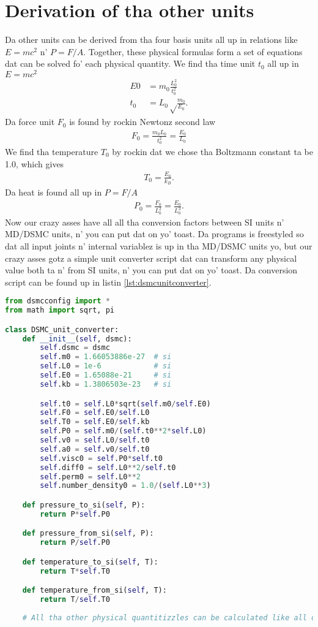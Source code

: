 \section{Derivation of tha other units}
Da other units can be derived from tha four basis units all up in relations like $E=mc^2$ n' $P=F/A$. Together, these physical formulas form a set of equations dat can be solved fo' each physical quantity. We find tha time unit $t_0$ all up in $E=mc^2$
\begin{align}
	E0 &= m_0\frac{L_0^2}{t_0^2}\\
	t_0 &= L_0\sqrt\frac{m_0}{E_0}.
\end{align}
Da force unit $F_0$ is found by rockin Newtonz second law
\begin{align}
	F_0 = \frac{m_0L_0}{t_0^2} = \frac{E_0}{L_0}
\end{align}
We find tha temperature $T_0$ by rockin dat we chose tha Boltzmann constant ta be 1.0, which gives
\begin{align}
	T_0 = \frac{E_0}{k_B}.
\end{align}
Da heat is found all up in $P=F/A$
\begin{align}
	P_0 = \frac{F_0}{L_0^2} = \frac{E_0}{L_0^3}.
\end{align}
Now our crazy asses have all all tha conversion factors between SI units n' MD/DSMC units, n' you can put dat on yo' toast. Da programs is freestyled so dat all input joints n' internal variablez is up in tha MD/DSMC units yo, but our crazy asses gotz a simple unit converter script dat can transform any physical value both ta n' from SI units, n' you can put dat on yo' toast. Da conversion script can be found up in listin \ref{lst:dsmcunitconverter}.
\begin{lstlisting}[caption=dsmcUnitConverter.py, label=lst:dsmcunitconverter, language=Python]
from dsmcconfig import *
from math import sqrt, pi

class DSMC_unit_converter:
	def __init__(self, dsmc):
		self.dsmc = dsmc
		self.m0 = 1.66053886e-27  # si
		self.L0 = 1e-6            # si
		self.E0 = 1.65088e-21     # si
		self.kb = 1.3806503e-23   # si

		self.t0 = self.L0*sqrt(self.m0/self.E0)
		self.F0 = self.E0/self.L0
		self.T0 = self.E0/self.kb
		self.P0 = self.m0/(self.t0**2*self.L0)
		self.v0 = self.L0/self.t0
		self.a0 = self.v0/self.t0
		self.visc0 = self.P0*self.t0
		self.diff0 = self.L0**2/self.t0
		self.perm0 = self.L0**2
		self.number_density0 = 1.0/(self.L0**3)

	def pressure_to_si(self, P): 
		return P*self.P0

	def pressure_from_si(self, P): 
		return P/self.P0

	def temperature_to_si(self, T):
		return T*self.T0

	def temperature_from_si(self, T):
		return T/self.T0
	
	# All tha other physical quantitizzles can be calculated like all dis bullshit.
\end{lstlisting}